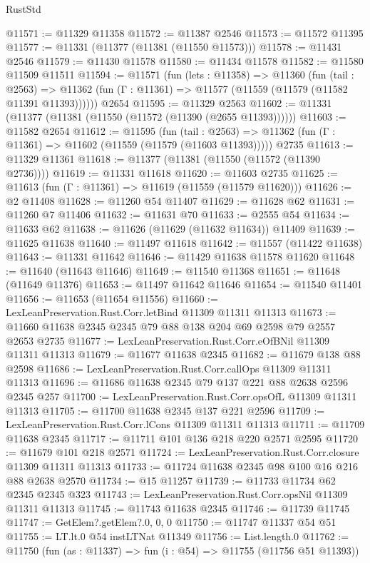 \begin{lexlean}{RustStd}
\begin{coremodule}
@11571 := @11329 @11358
@11572 := @11387 @2546
@11573 := @11572 @11395
@11577 := @11331 (@11377 (@11381 (@11550 @11573)))
@11578 := @11431 @2546
@11579 := @11430 @11578
@11580 := @11434 @11578
@11582 := @11580 @11509 @11511
@11594 := @11571
    (fun (lets : @11358) =>
    @11360
      (fun (tail : @2563) =>
      @11362 (fun (Γ : @11361) => @11577 (@11559 (@11579 (@11582 @11391 @11393))))))
    @2654
@11595 := @11329 @2563
@11602 := @11331 (@11377 (@11381 (@11550 (@11572 (@11390 (@2655 @11393))))))
@11603 := @11582 @2654
@11612 := @11595
    (fun (tail : @2563) => @11362 (fun (Γ : @11361) => @11602 (@11559 (@11579 (@11603 @11393)))))
    @2735
@11613 := @11329 @11361
@11618 := @11377 (@11381 (@11550 (@11572 (@11390 @2736))))
@11619 := @11331 @11618
@11620 := @11603 @2735
@11625 := @11613 (fun (Γ : @11361) => @11619 (@11559 (@11579 @11620)))
@11626 := @2 @11408
@11628 := @11260 @54 @11407
@11629 := @11628 @62
@11631 := @11260 @7 @11406
@11632 := @11631 @70
@11633 := @2555 @54
@11634 := @11633 @62
@11638 := @11626 (@11629 (@11632 @11634)) @11409
@11639 := @11625 @11638
@11640 := @11497 @11618
@11642 := @11557 (@11422 @11638)
@11643 := @11331 @11642
@11646 := @11429 @11638 @11578 @11620
@11648 := @11640 (@11643 @11646)
@11649 := @11540 @11368
@11651 := @11648 (@11649 @11376)
@11653 := @11497 @11642 @11646
@11654 := @11540 @11401
@11656 := @11653 (@11654 @11556)
@11660 := LexLeanPreservation.Rust.Corr.letBind @11309 @11311 @11313
@11673 := @11660 @11638 @2345 @2345 @79 @88 @138 @204 @69 @2598 @79 @2557 @2653 @2735
@11677 := LexLeanPreservation.Rust.Corr.eOfBNil @11309 @11311 @11313
@11679 := @11677 @11638 @2345
@11682 := @11679 @138 @88 @2598
@11686 := LexLeanPreservation.Rust.Corr.callOps @11309 @11311 @11313
@11696 := @11686 @11638 @2345 @79 @137 @221 @88 @2638 @2596 @2345 @257
@11700 := LexLeanPreservation.Rust.Corr.opsOfL @11309 @11311 @11313
@11705 := @11700 @11638 @2345 @137 @221 @2596
@11709 := LexLeanPreservation.Rust.Corr.lCons @11309 @11311 @11313
@11711 := @11709 @11638 @2345
@11717 := @11711 @101 @136 @218 @220 @2571 @2595
@11720 := @11679 @101 @218 @2571
@11724 := LexLeanPreservation.Rust.Corr.closure @11309 @11311 @11313
@11733 := @11724 @11638 @2345 @98 @100 @16 @216 @88 @2638 @2570
@11734 := @15 @11257
@11739 := @11733 @11734 @62 @2345 @2345 @323
@11743 := LexLeanPreservation.Rust.Corr.opsNil @11309 @11311 @11313
@11745 := @11743 @11638 @2345
@11746 := @11739 @11745
@11747 := GetElem?.getElem?.{0, 0, 0}
@11750 := @11747 @11337 @54 @51
@11755 := LT.lt.{0} @54 instLTNat @11349
@11756 := List.length.{0}
@11762 := @11750 (fun (as : @11337) => fun (i : @54) => @11755 (@11756 @51 @11393))

\end{coremodule}
\end{lexlean}
